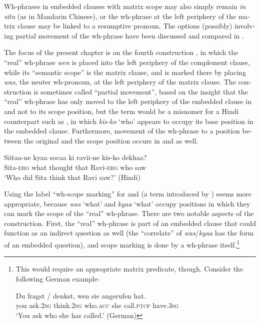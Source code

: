 \documentclass[output=paper,colorlinks,citecolor=brown]{langscibook}
\begin{document}
\begin{otherlanguage}{english}
\noindent Wh-phrases in embedded clauses with matrix scope may also simply remain \textit{in situ} (as in Mandarin Chinese), or the wh-phrase at the left periphery of the matrix clause may be linked to a resumptive pronoun. The options (possibly) involving partial movement of the wh-phrase have been discussed and compared in \citet{Fanselow2017a}.  

The focus of the present chapter is on the fourth construction , in which the “real” wh-phrase \textit{wen} is placed into the left periphery of the complement clause, while its “semantic scope” is the matrix clause, and is marked there by placing \textit{was}, the neuter wh-pronoun, at the left periphery of the matrix clause. The construction  is sometimes called “partial movement”, based on the insight that the “real” wh-phrase has only moved to the left periphery of the embedded clause in  and not to its scope position, but the term would be a misnomer for a Hindi counterpart such as , in which \textit{kis-ko} `who' appears to occupy its base position in the embedded clause. Furthermore, movement of the wh-phrase to a position between the original and the scope position occurs in  and  as well.

\ea 
\gll  Siitaa-ne 	kyaa 	socaa 	ki 	ravii-ne 	kis-ko 	dekhaa?  \\
    Sita-\textsc{erg} what thought that Ravi-\textsc{erg} who saw  \\
    \glt    ‘Who did Sita think that Ravi saw?' \hfill (Hindi)
    \label{ex:fanselow:4}
    \z

\noindent Using the label “wh-scope marking” for  and  (a term introduced by \citealt{Riemsdijk1983}) seems more appropriate, because \textit{was} `what' and \textit{kyaa} `what' occupy positions in which they can mark the scope of the “real” wh-phrase. There are two notable aspects of the construction. First, the “real” wh-phrase is part of an embedded clause that could function as an indirect question as well (the “correlate” of \textit{was}/\textit{kyaa} has the form of an embedded question), and scope marking is done by a wh-phrase itself.\footnote{This would require an appropriate matrix predicate, though. Consider the following German example:

\ea 
\gll  Du fragst / \minsp{*} denkst, wen sie angerufen hat.  \\
    you ask.\textsc{2sg} {} {} think.\textsc{2sg} who.\textsc{acc} she call.\textsc{ptcp} have.\textsc{3sg}  \\
    \glt    ‘You ask who she has called.' \hfill (German)
    \z

}
\end{otherlanguage}
\end{document}

